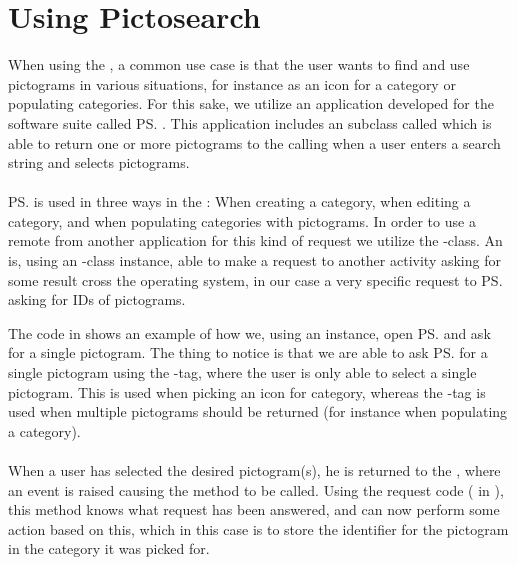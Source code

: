 
\section{Using Pictosearch}
\label{sec:using_pictosearch}

When using the \ct, a common use case is that the user wants to find and use pictograms in various situations, for instance as an icon for a category or populating categories. For this sake, we utilize an application developed for the \giraf software suite called \ps. This application includes an  subclass called  which is able to return one or more pictograms to the calling  when a user enters a search string and selects pictograms. 
\\\\
\ps is used in three ways in the \ct: When creating a category, when editing a category, and when populating categories with pictograms. In order to use a remote  from another application for this kind of request we utilize the -class. An  is, using an -class instance, able to make a request to another activity asking for some result cross the operating system, in our case a very specific request to \ps asking for IDs of pictograms. 



The code in  shows an example of how we, using an  instance, open \ps and ask for a single pictogram. The thing to notice is that we are able to ask \ps for a single pictogram using the -tag, where the user is only able to select a single pictogram. This is used when picking an icon for category, whereas the -tag is used when multiple pictograms should be returned (for instance when populating a category). 
\\\\
When a user has selected the desired pictogram(s), he is returned to the \ct, where an event is raised causing the method  to be called. Using the request code ( in ), this method knows what request has been answered, and can now perform some action based on this, which in this case is to store the identifier for the pictogram in the category it was picked for.

